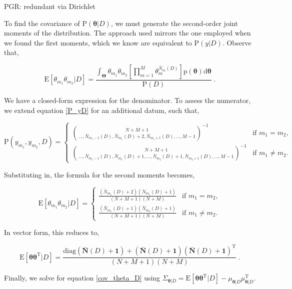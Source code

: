 \documentclass[12pt]{report}
\begin{document}
PGR: redundant via Dirichlet

To find the covariance of $\text{P}(\bm{\theta}|D)$, we must generate the second-order joint moments of the distribution. The approach used mirrors the one employed when we found the first moments, which we know are equivalent to $\text{P}(y|D)$. Observe that,

\begin{equation}
\text{E}[\theta_{m_1} \theta_{m_2} | D] = \frac{\int_{\bm{\Theta}} \theta_{m_1} \theta_{m_2} \left[ \prod_{m=1}^M \theta_m^{\bar{N}_m(D)} \right] \text{p}(\bm{\theta}) \mathrm{d}\bm{\theta}}{\text{P}(D)} \;.
\end{equation}

We have a closed-form expression for the denominator. To assess the numerator, we extend equation \eqref{P_yD} for an additional datum, such that,

\begin{equation}
\text{P}(y_{m_1},y_{m_2},D) = 
\begin{cases}
\binom{N+M+1}{\ldots,\bar{N}_{m_1-1}(D),\bar{N}_{m_1}(D)+2,\bar{N}_{m_1+1}(D),\ldots,M-1}^{-1} & \text{if } m_1 = m_2, \\ 
\binom{N+M+1}{\ldots,\bar{N}_{m_1-1}(D),\bar{N}_{m_1}(D)+1,\ldots,\bar{N}_{m_2}(D)+1,\bar{N}_{m_2+1}(D),\ldots,M-1}^{-1} & \text{if } m_1 \neq m_2.
\end{cases}
\end{equation}

Substituting in, the formula for the second moments becomes,

\begin{equation}
\text{E}[\theta_{m_1} \theta_{m_2} | D] =
\begin{cases}
\frac{(\bar{N}_{m_1}(D)+2)(\bar{N}_{m_1}(D)+1)}{(N+M+1)(N+M)} & \text{if } m_1 = m_2, \\  
\frac{(\bar{N}_{m_1}(D)+1)(\bar{N}_{m_2}(D)+1)}{(N+M+1)(N+M)} & \text{if } m_1 \neq m_2.
\end{cases}
\end{equation}

In vector form, this reduces to,

\begin{equation}
\text{E}[\bm{\theta} \bm{\theta}^\text{T} | D] = \frac{\text{diag}(\bar{\bm{N}}(D) + \bm{1}) + (\bar{\bm{N}}(D) + \bm{1}) (\bar{\bm{N}}(D) + \bm{1})^\text{T}}{(N+M+1)(N+M)} \;.
\end{equation}

Finally, we solve for equation \eqref{cov_theta_D} using $\Sigma_{\bm{\theta} | D} = \text{E}[\bm{\theta} \bm{\theta}^\text{T} | D] -  \mu_{\bm{\theta} | D} \mu_{\bm{\theta} | D}^\text{T}$.
\end{document}
